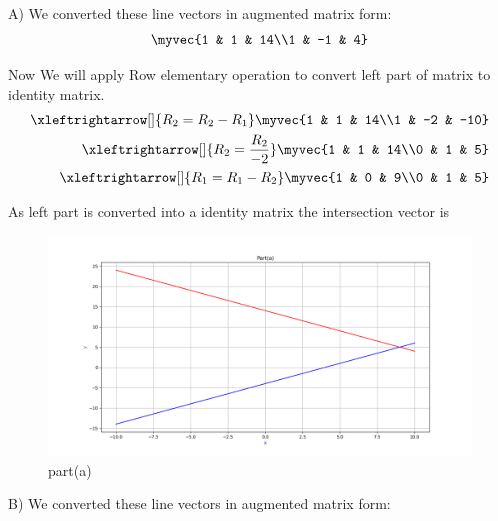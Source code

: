 \begin{enumerate}[label=\thesection.\arabic*.,ref=\thesection.\theenumi]
A)
We converted these line vectors in augmented matrix form:\\ 

\begin{align*}
    \myvec{1 & 1 & 14\\1 & -1 & 4}\\
\end{align*} 

Now We will apply Row elementary operation to convert left part of matrix to identity matrix.\\

\begin{align*}
    \xleftrightarrow[]{R_{2}=R_{2}-R_{1}} \myvec{1 & 1 & 14\\1 & -2 & -10}
\\
    \xleftrightarrow[]{R_{2}=\frac{R_{2}}{-2}} \myvec{1 & 1 & 14\\0 & 1 & 5}
\\
    \xleftrightarrow[]{R_{1}=R_{1}-R_{2}} \myvec{1 & 0 & 9\\0 & 1 & 5}
\end{align*}

As left part is converted into a identity matrix the intersection vector is \\
    
\renewcommand{\thefigure}{\theenumi.\arabic{figure}}
\begin{figure}[!ht]
    \centering
    \includegraphics[width=\columnwidth]{./figures/A1_parta}
\caption{part(a)}
\label{fig: part(a)}
\end{figure}

B)
We converted these line vectors in augmented matrix form:\\ 


\end{enumerate}
